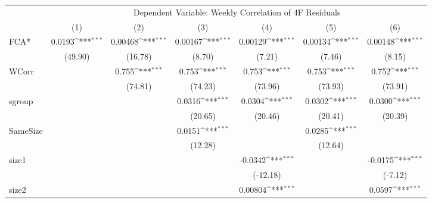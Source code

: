 {
\def\sym#1{\ifmmode^{#1}\else\(^{#1}\)\fi}
\begin{tabular}{l*{6}{c}}
\hline\hline
 & \multicolumn{6}{c}{Dependent Variable: Weekly Correlation of 4F Residuals}                 \\
 \cline{2-7}
                    &\multicolumn{1}{c}{(1)}         &\multicolumn{1}{c}{(2)}         &\multicolumn{1}{c}{(3)}         &\multicolumn{1}{c}{(4)}         &\multicolumn{1}{c}{(5)}         &\multicolumn{1}{c}{(6)}         \\
\hline
FCA*                &      0.0193\sym{***}&     0.00468\sym{***}&     0.00167\sym{***}&     0.00129\sym{***}&     0.00134\sym{***}&     0.00148\sym{***}\\
                    &     (49.90)         &     (16.78)         &      (8.70)         &      (7.21)         &      (7.46)         &      (8.15)         \\
[1em]
WCorr               &                     &       0.755\sym{***}&       0.753\sym{***}&       0.753\sym{***}&       0.753\sym{***}&       0.752\sym{***}\\
                    &                     &     (74.81)         &     (74.23)         &     (73.96)         &     (73.93)         &     (73.91)         \\
[1em]
sgroup              &                     &                     &      0.0316\sym{***}&      0.0304\sym{***}&      0.0302\sym{***}&      0.0300\sym{***}\\
                    &                     &                     &     (20.65)         &     (20.46)         &     (20.41)         &     (20.39)         \\
[1em]
SameSize            &                     &                     &      0.0151\sym{***}&                     &      0.0285\sym{***}&                     \\
                    &                     &                     &     (12.28)         &                     &     (12.64)         &                     \\
[1em]
size1               &                     &                     &                     &     -0.0342\sym{***}&                     &     -0.0175\sym{***}\\
                    &                     &                     &                     &    (-12.18)         &                     &     (-7.12)         \\
[1em]
size2               &                     &                     &                     &     0.00804\sym{***}&                     &      0.0597\sym{***}\\

\end{tabular}}
